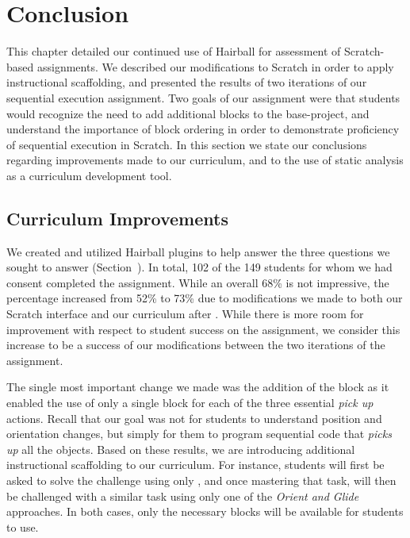 \section{Conclusion} 
This chapter detailed our continued use of Hairball for assessment of
Scratch-based assignments. We described our modifications to Scratch in order
to apply instructional scaffolding, and presented the results of two iterations
of our sequential execution assignment. Two goals of our assignment were that
students would recognize the need to add additional blocks to the base-project,
and understand the importance of block ordering in order to demonstrate
proficiency of sequential execution in Scratch. In this section we state our
conclusions regarding improvements made to our curriculum, and to the use of
static analysis as a curriculum development tool.

\subsection{Curriculum Improvements}
We created and utilized Hairball plugins to help answer the three questions we
sought to answer (Section~). In total, 102 of the 149
students for whom we had consent completed the assignment. While an overall
68\% is not impressive, the percentage increased from 52\% to 73\% due to
modifications we made to both our Scratch interface and our curriculum after
\sone{}. While there is more room for improvement with respect to student
success on the assignment, we consider this increase to be a success of our
modifications between the two iterations of the assignment.

The single most important change we made was the addition of the \glideto{}
block as it enabled the use of only a single block for each of the three
essential \emph{pick up} actions. Recall that our goal was not for students to
understand position and orientation changes, but simply for them to program
sequential code that \emph{picks up} all the objects. Based on these results,
we are introducing additional instructional scaffolding to our curriculum. For
instance, students will first be asked to solve the challenge using only
\glideto{}, and once mastering that task, will then be challenged with a
similar task using only one of the \emph{Orient and Glide} approaches. In both
cases, only the necessary blocks will be available for students to use.

